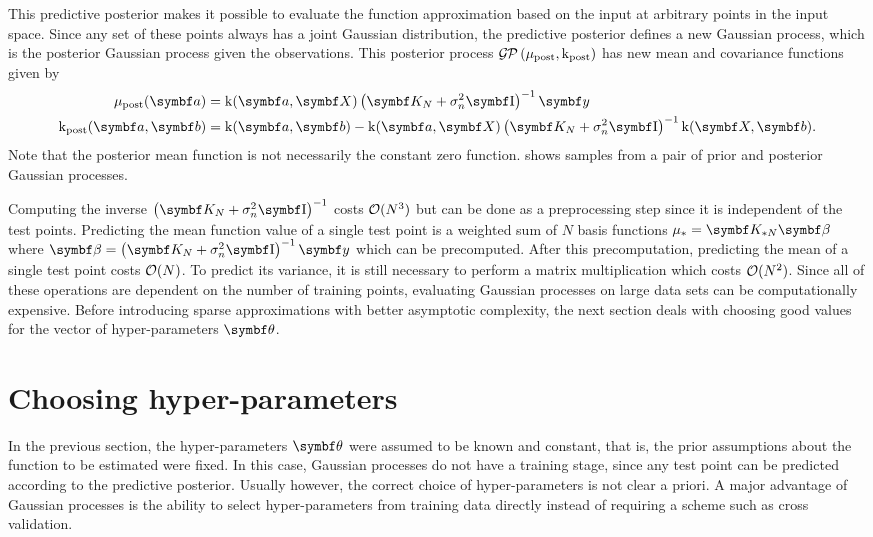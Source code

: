 This predictive posterior makes it possible to evaluate the function approximation based on the input at arbitrary points in the input space.
Since any set of these points always has a joint Gaussian distribution, the predictive posterior defines a new Gaussian process, which is the posterior Gaussian process given the observations.
This posterior process $\operatorname{\mathcal{G\mkern-1mu P}\mkern3mu}(\mu_\text{post}, \operatorname{k}_\text{post})$ has new mean and covariance functions given by
\begin{align}
    \begin{split}
        \mu_\text{post}(\mat{a}) &= \K(\mat{a}, \mat{X}) \left(\mat{K_N} + \sigma_n^2 \Eye \right)^{-1} \mat{y} \\
        \K_\text{post}(\mat{a}, \mat{b}) &= \K(\mat{a}, \mat{b}) - \K(\mat{a}, \mat{X}) \left( \mat{K_N} + \sigma_n^2 \Eye \right)^{-1} \K(\mat{X}, \mat{b}).
    \end{split}
\end{align}
Note that the posterior mean function is not necessarily the constant zero function.
 shows samples from a pair of prior and posterior Gaussian processes.

Computing the inverse $\left(\mat{K_N} + \sigma_n^2 \Eye \right)^{-1}$ costs $\operatorname{\mathcal{O}}(N^3)$ but can be done as a preprocessing step since it is independent of the test points.
Predicting the mean function value of a single test point is a weighted sum of $N$ basis functions $\mu_\ast = \mat{K_{\ast N}} \mat{\beta}$ where $\mat{\beta} = \left(\mat{K_N} + \sigma_n^2 \Eye \right)^{-1} \mat{y}$ which can be precomputed.
After this precomputation, predicting the mean of a single test point costs $\operatorname{\mathcal{O}}(N)$.
To predict its variance, it is still necessary to perform a matrix multiplication which costs $\operatorname{\mathcal{O}}(N^2)$.
Since all of these operations are dependent on the number of training points, evaluating Gaussian processes on large data sets can be computationally expensive.
Before introducing sparse approximations with better asymptotic complexity, the next section deals with choosing good values for the vector of hyper-parameters $\mat{\theta}$.

\section{Choosing hyper-parameters}
In the previous section, the hyper-parameters $\mat{\theta}$ were assumed to be known and constant, that is, the prior assumptions about the function to be estimated were fixed.
In this case, Gaussian processes do not have a training stage, since any test point can be predicted according to the predictive posterior.
Usually however, the correct choice of hyper-parameters is not clear a priori.
A major advantage of Gaussian processes is the ability to select hyper-parameters from training data directly instead of requiring a scheme such as cross validation.

